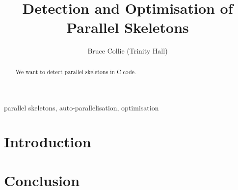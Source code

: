 \documentclass[journal]{IEEEtran}
\begin{document}
\title{Detection and Optimisation of Parallel Skeletons}
\author{Bruce Collie (Trinity Hall)}


\maketitle

\begin{abstract}

We want to detect parallel skeletons in C code.

\end{abstract}

\begin{IEEEkeywords}
parallel skeletons, auto-parallelisation, optimisation
\end{IEEEkeywords}

\IEEEpeerreviewmaketitle

\section{Introduction}

\section{Conclusion}

\ifCLASSOPTIONcaptionsoff
  \newpage
\fi
\end{document}
